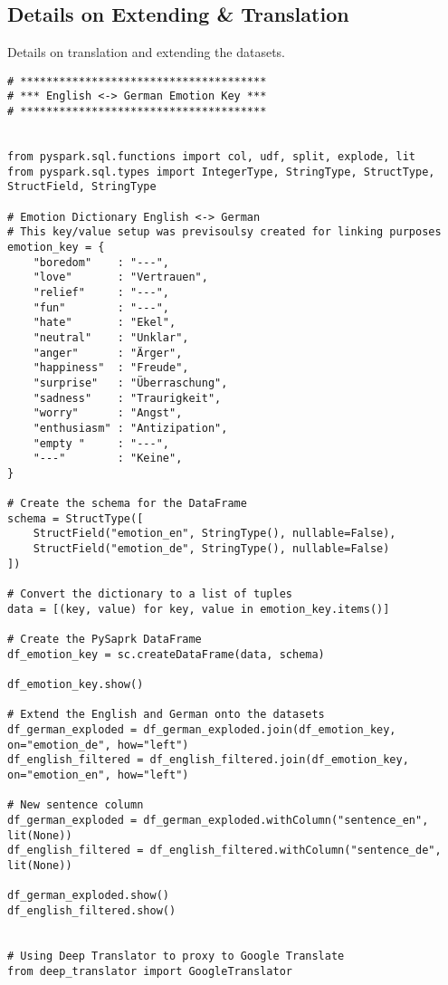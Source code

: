 \subsection{Details on Extending \& Translation}
\label{appendix:dataset_translation}
Details on translation and extending the datasets.
\begin{verbatim}
# **************************************
# *** English <-> German Emotion Key ***
# **************************************


from pyspark.sql.functions import col, udf, split, explode, lit
from pyspark.sql.types import IntegerType, StringType, StructType, StructField, StringType

# Emotion Dictionary English <-> German
# This key/value setup was previsoulsy created for linking purposes
emotion_key = {
    "boredom"    : "---",
    "love"       : "Vertrauen",
    "relief"     : "---",
    "fun"        : "---",
    "hate"       : "Ekel",
    "neutral"    : "Unklar",
    "anger"      : "Ärger",
    "happiness"  : "Freude",
    "surprise"   : "Überraschung", 
    "sadness"    : "Traurigkeit", 
    "worry"      : "Angst",
    "enthusiasm" : "Antizipation", 
    "empty "     : "---",
    "---"        : "Keine",
}

# Create the schema for the DataFrame
schema = StructType([
    StructField("emotion_en", StringType(), nullable=False),
    StructField("emotion_de", StringType(), nullable=False)
])

# Convert the dictionary to a list of tuples
data = [(key, value) for key, value in emotion_key.items()]

# Create the PySaprk DataFrame
df_emotion_key = sc.createDataFrame(data, schema)

df_emotion_key.show()

# Extend the English and German onto the datasets
df_german_exploded = df_german_exploded.join(df_emotion_key, on="emotion_de", how="left")
df_english_filtered = df_english_filtered.join(df_emotion_key, on="emotion_en", how="left")

# New sentence column
df_german_exploded = df_german_exploded.withColumn("sentence_en", lit(None))
df_english_filtered = df_english_filtered.withColumn("sentence_de", lit(None))

df_german_exploded.show()
df_english_filtered.show()


# Using Deep Translator to proxy to Google Translate
from deep_translator import GoogleTranslator



\end{verbatim}
